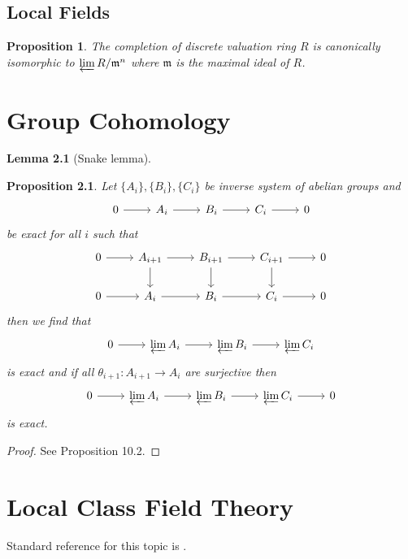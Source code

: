 \documentclass[twoside, 12pt]{iiser-thesis}
\newtheorem{prop}[thm]{ Proposition}
\newtheorem{lem}[thm]{ Lemma}
\begin{document}
\section{Local Fields}
\begin{prop}
The completion of discrete valuation ring $R$ is canonically isomorphic to $\varprojlim R/ \mathfrak m ^n$ where $\mathfrak m$ is the maximal ideal of $R$.
\end{prop}
\chapter{Group Cohomology}
\begin{lem}[Snake lemma]
\end{lem}
\begin{prop}\label{inverselimitexact}
Let $\{A_i\},\{B_i\}, \{C_i\}$ be inverse system of abelian groups and \[ \begin{tikzcd}
0 \arrow[r] & A_i \arrow[r] & B_i \arrow[r] & C_i \arrow[r] & 0 
\end{tikzcd}\] be exact for all $i$ such that 
\[ \begin{tikzcd}
 0 \arrow [r] & A_{i+1} \arrow[r] \arrow[d] & B_{i+1} \arrow[d] \arrow[r] & C_{i+1} \arrow[r] \arrow[d] & 0 \\
0 \arrow[r] & A_i \arrow[r] & B_i \arrow[r] & C_i \arrow[r] & 0
\end{tikzcd} \] then we find that 
\[ \begin{tikzcd}
0 \arrow[r] & \varprojlim A_i \arrow[r] & \varprojlim B_i \arrow[r] & \varprojlim C_i 
\end{tikzcd}\]
is exact and if all $\theta_{i+1}:A_{i+1}\rightarrow A_i$ are surjective then \[ \begin{tikzcd}
0 \arrow[r] & \varprojlim A_i \arrow[r] & \varprojlim B_i \arrow[r] & \varprojlim C_i \arrow[r] & 0
\end{tikzcd}\] is exact.
\end{prop}
\begin{proof}
See \cite{atiyah} Proposition 10.2.
\end{proof}
\chapter{Local Class Field Theory}
Standard reference for this topic is \cite{milneCFT}.
\end{document}
